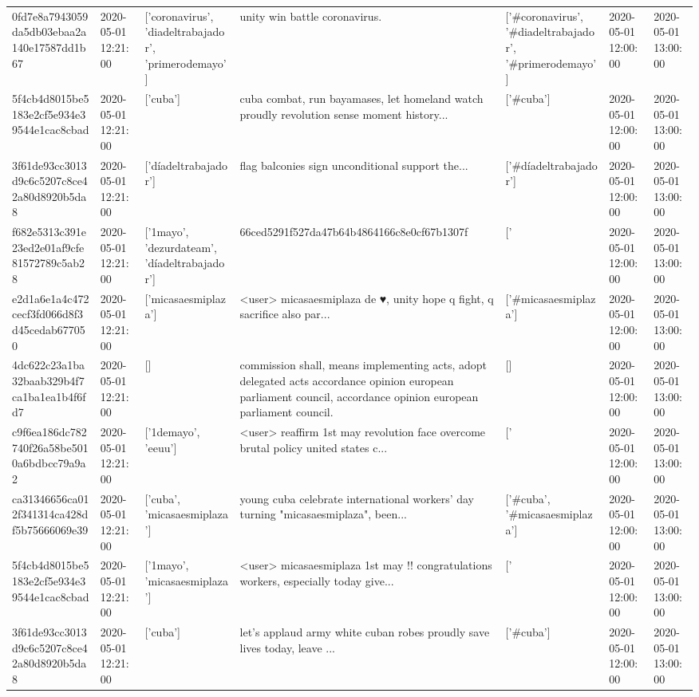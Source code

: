 \begin{tabular}{lllllll}
0fd7e8a7943059da5db03ebaa2a140e17587dd1b67 & 2020-05-01 12:21:00 & ['coronavirus', 'diadeltrabajador', 'primerodemayo'] & unity win battle coronavirus. & ['#coronavirus', '#diadeltrabajador', '#primerodemayo'] & 2020-05-01 12:00:00 & 2020-05-01 13:00:00 \\
5f4cb4d8015be5183e2cf5e934e39544e1cac8cbad & 2020-05-01 12:21:00 & ['cuba'] & cuba combat, run bayamases, let homeland watch proudly revolution sense moment history... & ['#cuba'] & 2020-05-01 12:00:00 & 2020-05-01 13:00:00 \\
3f61de93cc3013d9c6c5207c8ce42a80d8920b5da8 & 2020-05-01 12:21:00 & ['díadeltrabajador'] & flag balconies sign unconditional support the... & ['#díadeltrabajador'] & 2020-05-01 12:00:00 & 2020-05-01 13:00:00 \\
f682e5313c391e23ed2e01af9cfe81572789c5ab28 & 2020-05-01 12:21:00 & ['1mayo', 'dezurdateam', 'díadeltrabajador'] & 66ced5291f527da47b64b4864166c8e0cf67b1307f & ['#1mayo', '#dezurdateam', '#díadeltrabajador'] & 2020-05-01 12:00:00 & 2020-05-01 13:00:00 \\
e2d1a6e1a4c472cecf3fd066d8f3d45cedab677050 & 2020-05-01 12:21:00 & ['micasaesmiplaza'] & <user> micasaesmiplaza de ♥️, unity hope q fight, q sacrifice also par... & ['#micasaesmiplaza'] & 2020-05-01 12:00:00 & 2020-05-01 13:00:00 \\
4dc622c23a1ba32baab329b4f7ca1ba1ea1b4f6fd7 & 2020-05-01 12:21:00 & [] & commission shall, means implementing acts, adopt delegated acts accordance opinion european parliament council, accordance opinion european parliament council. & [] & 2020-05-01 12:00:00 & 2020-05-01 13:00:00 \\
c9f6ea186dc782740f26a58be5010a6bdbcc79a9a2 & 2020-05-01 12:21:00 & ['1demayo', 'eeuu'] & <user> reaffirm 1st may revolution face overcome brutal policy united states c... & ['#1demayo', '#eeuu'] & 2020-05-01 12:00:00 & 2020-05-01 13:00:00 \\
ca31346656ca012f341314ca428df5b75666069e39 & 2020-05-01 12:21:00 & ['cuba', 'micasaesmiplaza'] & young cuba celebrate international workers' day turning "micasaesmiplaza", been... & ['#cuba', '#micasaesmiplaza'] & 2020-05-01 12:00:00 & 2020-05-01 13:00:00 \\
5f4cb4d8015be5183e2cf5e934e39544e1cac8cbad & 2020-05-01 12:21:00 & ['1mayo', 'micasaesmiplaza'] & <user> micasaesmiplaza 1st may !!️ congratulations workers, especially today give... & ['#1mayo', '#micasaesmiplaza'] & 2020-05-01 12:00:00 & 2020-05-01 13:00:00 \\
3f61de93cc3013d9c6c5207c8ce42a80d8920b5da8 & 2020-05-01 12:21:00 & ['cuba'] & let's applaud army white cuban robes proudly save lives today, leave ... & ['#cuba'] & 2020-05-01 12:00:00 & 2020-05-01 13:00:00 \\

\end{tabular}
